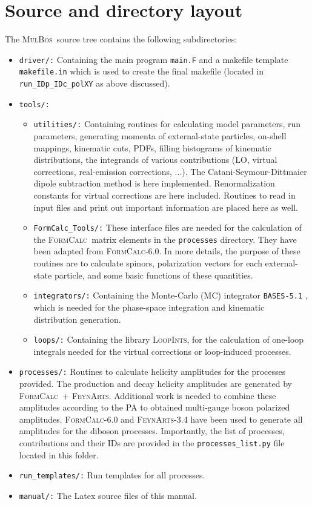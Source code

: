 \documentclass[english,12pt]{article}
\newcommand{\mulbos}{\textsc{MulBos}}
\newcommand{\formcalc}{\textsc{FormCalc}}
\newcommand{\feynarts}{\textsc{FeynArts}}
\newcommand{\loopints}{\textsc{LoopInts}}
\begin{document}
\section{Source and directory layout}
The \mulbos\ source tree contains the following subdirectories:
\begin{itemize}
\item {\tt driver/:} Containing the main program {\tt main.F} and a makefile template {\tt makefile.in} 
which is used to create the final makefile (located in {\tt run\_IDp\_IDc\_polXY} as above discussed).
\item {\tt tools/:}
\begin{itemize}
\item {\tt utilities/:} Containing routines for calculating model parameters, run 
parameters, 
generating momenta of external-state particles, 
on-shell mappings, kinematic cuts, PDFs, filling histograms of kinematic distributions, 
the integrands of various contributions (LO, virtual corrections, real-emission corrections, ...). 
The Catani-Seymour-Dittmaier dipole subtraction method is here implemented. 
Renormalization constants for virtual corrections are here included. 
Routines to read in input files and print out important information are placed here as well.
\item {\tt FormCalc\_Tools/:} These interface files are needed for the calculation of the \formcalc\ matrix 
elements in the {\tt processes} directory. They have been adapted from \formcalc-6.0. 
In more details, the purpose of these routines are to calculate spinors, polarization vectors for each external-state 
particle, and some basic functions of these quantities. 
\item {\tt integrators/:} Containing the Monte-Carlo (MC) integrator {\tt BASES-5.1} \cite{Kawabata:1985yt,Kawabata:1995th}, 
which is needed for the phase-space integration and kinematic distribution generation. 
\item {\tt loops/:} Containing the library \loopints, for the calculation of 
one-loop integrals needed for the virtual corrections or loop-induced processes.
\end{itemize}
\item {\tt processes/:} Routines to calculate helicity amplitudes for the processes
provided. The production and decay helicity 
amplitudes are generated by \formcalc\ + \feynarts. 
Additional work is needed to combine these amplitudes according to the PA 
to obtained multi-gauge boson polarized amplitudes. 
\formcalc-6.0 and \feynarts-3.4 have been used to generate all amplitudes for the diboson processes. 
Importantly, the list of processes, contributions and their IDs are provided in the {\tt processes\_list.py} file 
located in this folder.
\item {\tt run\_templates/:} Run templates for all processes.
\item {\tt manual/:} The Latex source files of this manual.
\end{itemize} 
\end{document}
